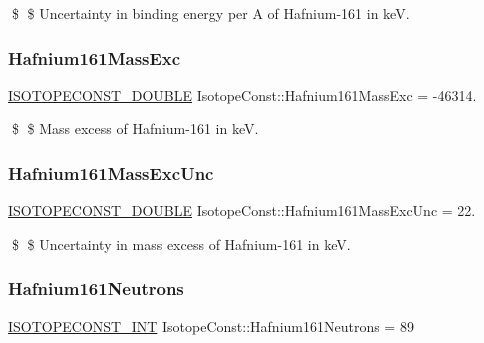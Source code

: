 \$ \$ Uncertainty in binding energy per A of Hafnium-\/161 in keV. \mbox{\label{group___isotope_const-_hafnium-_hf161_ga9bbca7aa648838bed94e4aff5708f89c}} 
\subsubsection{\texorpdfstring{Hafnium161\+Mass\+Exc}{Hafnium161MassExc}}
{\footnotesize\ttfamily \mbox{\hyperlink{group___isotope_const-_macros_ga8f45a7272ce02c0b4c65c44636ed719a}{I\+S\+O\+T\+O\+P\+E\+C\+O\+N\+S\+T\+\_\+\+D\+O\+U\+B\+LE}} Isotope\+Const\+::\+Hafnium161\+Mass\+Exc = -\/46314.}

\$ \$ Mass excess of Hafnium-\/161 in keV. \mbox{\label{group___isotope_const-_hafnium-_hf161_gad9b6426734875159a2038b06ec1ff233}} 
\subsubsection{\texorpdfstring{Hafnium161\+Mass\+Exc\+Unc}{Hafnium161MassExcUnc}}
{\footnotesize\ttfamily \mbox{\hyperlink{group___isotope_const-_macros_ga8f45a7272ce02c0b4c65c44636ed719a}{I\+S\+O\+T\+O\+P\+E\+C\+O\+N\+S\+T\+\_\+\+D\+O\+U\+B\+LE}} Isotope\+Const\+::\+Hafnium161\+Mass\+Exc\+Unc = 22.}

\$ \$ Uncertainty in mass excess of Hafnium-\/161 in keV. \mbox{\label{group___isotope_const-_hafnium-_hf161_ga07a10a785ee0808ff50b2084ea208dc3}} 
\subsubsection{\texorpdfstring{Hafnium161\+Neutrons}{Hafnium161Neutrons}}
{\footnotesize\ttfamily \mbox{\hyperlink{group___isotope_const-_macros_ga5f18360b3e99483a35c32d789e62621c}{I\+S\+O\+T\+O\+P\+E\+C\+O\+N\+S\+T\+\_\+\+I\+NT}} Isotope\+Const\+::\+Hafnium161\+Neutrons = 89}

